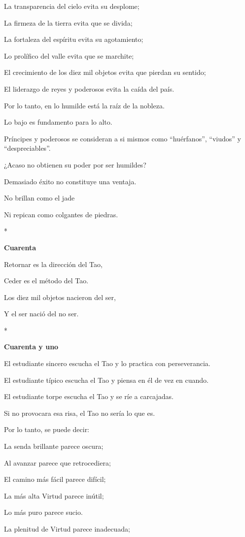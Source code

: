 La transparencia del cielo evita su desplome;

La firmeza de la tierra evita que se divida;

La fortaleza del espíritu evita su agotamiento;

Lo prolífico del valle evita que se marchite;

El crecimiento de los diez mil objetos evita que pierdan su sentido;

El liderazgo de reyes y poderosos evita la caída del país.

Por lo tanto, en lo humilde está la raíz de la nobleza.

Lo bajo es fundamento para lo alto.

Príncipes y poderosos se consideran a si mismos como ``huérfanos'',
``viudos'' y ``despreciables''.

¿Acaso no obtienen su poder por ser humildes?

Demasiado éxito no constituye una ventaja.

No brillan como el jade

Ni repican como colgantes de piedras.

*

\textbf{Cuarenta}

Retornar es la dirección del Tao,

Ceder es el método del Tao.

Los diez mil objetos nacieron del ser,

Y el ser nació del no ser.

*

\textbf{Cuarenta y uno}

El estudiante sincero escucha el Tao y lo practica con perseverancia.

El estudiante típico escucha el Tao y piensa en él de vez en cuando.

El estudiante torpe escucha el Tao y se ríe a carcajadas.

Si no provocara esa risa, el Tao no sería lo que es.

Por lo tanto, se puede decir:

La senda brillante parece oscura;

Al avanzar parece que retrocediera;

El camino más fácil parece difícil;

La más alta Virtud parece inútil;

Lo más puro parece sucio.

La plenitud de Virtud parece inadecuada;

